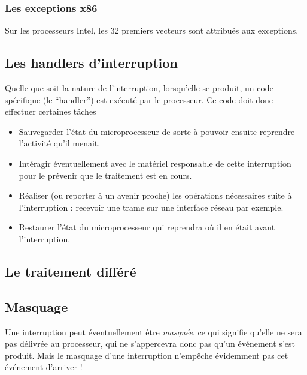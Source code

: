 \begin{itemize}
\subsubsection{Les exceptions x86}

   Sur les processeurs Intel, les 32 premiers vecteurs sont attribués
aux exceptions.

%
\subsection{Les handlers d'interruption}

   Quelle que soit la nature de l'interruption, lorsqu'elle se
produit, un code spécifique (le ``handler'') est exécuté par le
processeur. Ce code doit donc effectuer certaines tâches

\begin{itemize}
   \item Sauvegarder l'état du microprocesseur de sorte à pouvoir
     ensuite reprendre l'activité qu'il menait.
   \item Intéragir éventuellement avec le matériel responsable de
     cette interruption pour le prévenir que le traitement est en
     cours. 
   \item Réaliser (ou reporter à un avenir proche) les opérations
     nécessaires suite à l'interruption : recevoir une trame sur une
     interface réseau par exemple.
   \item Restaurer l'état du microprocesseur qui reprendra où il en
     était avant l'interruption.
\end{itemize}
%
\subsection{Le traitement différé}

%
\subsection{Masquage}

   Une interruption peut éventuellement être  {\em masquée}, ce qui
signifie qu'elle ne sera pas délivrée au processeur, qui ne
s'appercevra donc pas qu'un événement s'est produit. Mais le masquage
d'une interruption n'empêche évidemment pas cet événement d'arriver !


\end{itemize}
